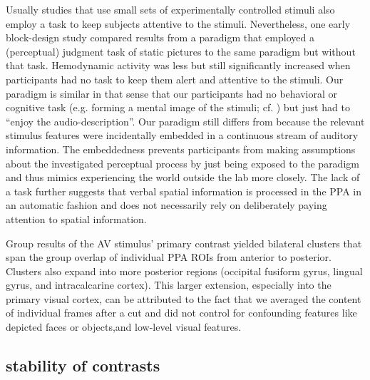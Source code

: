 \documentclass[english]{article}
\begin{document}
Usually studies that use small sets of experimentally controlled stimuli also
employ a task to keep subjects attentive to the stimuli.
Nevertheless, one early block-design study \citep{epstein1998ppa} compared
results from a paradigm that employed a (perceptual) judgment task of static
pictures to the same paradigm but without that task.
Hemodynamic activity was less but still significantly increased when
participants had no task to keep them alert and attentive to the stimuli.
Our paradigm is similar in that sense that our participants had no behavioral or
cognitive task (e.g. forming a mental image of the stimuli; cf.
\citep{ocraven2000mental})  but just had to ``enjoy the audio-description''.
Our paradigm still differs from \citep{epstein1998ppa} because the relevant
stimulus features were incidentally embedded in a continuous stream of auditory
information.
The embeddedness prevents participants from making assumptions about the
investigated perceptual process by just being exposed to the paradigm and thus
mimics experiencing the world outside the lab more closely.
The lack of a task further suggests that verbal spatial information is processed
in the PPA in an automatic fashion and does not necessarily rely on deliberately
paying attention to spatial information.

Group results of the AV stimulus' primary contrast yielded bilateral clusters
that span the group overlap of individual PPA ROIs from anterior to posterior.
Clusters also expand into more posterior regions (occipital fusiform gyrus,
lingual gyrus, and intracalcarine cortex).
This larger extension, especially into the primary visual cortex, can be
attributed to the fact that we averaged the content of individual frames after a
cut and did not control for confounding features like depicted faces or
objects,and low-level visual features.


\subsection{stability of contrasts}
\end{document}
